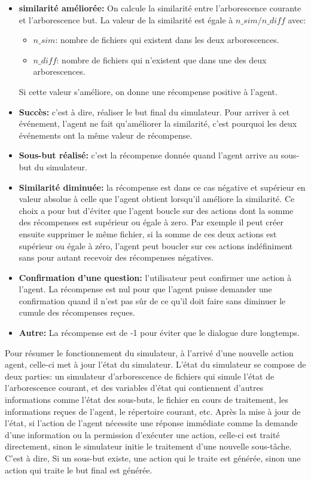 \begin{itemize}
	\item \textbf{similarité améliorée:} On calcule la similarité entre l'arborescence courante et l'arborescence but. La valeur de la similarité est égale à $n\_sim/n\_diff$ avec: 
	\begin{itemize}
		\item $n\_sim$: nombre de fichiers qui existent dans les deux arborescences.
		\item $n\_diff$: nombre de fichiers qui n'existent que dans une des deux arborescences.  
	\end{itemize}
	Si cette valeur s'améliore, on donne une récompense positive à l'agent.
	\item \textbf{Succès:} c'est à dire, réaliser le but final du simulateur. Pour arriver à cet événement, l'agent ne fait qu'améliorer la similarité, c'est pourquoi les deux événements ont la même valeur de récompense.
	\item \textbf{Sous-but réalisé:} c'est la récompense donnée quand l'agent arrive au sous-but du simulateur.
	\item \textbf{Similarité diminuée:} la récompense est dans ce cas négative et supérieur en valeur absolue à celle que l'agent obtient lorsqu'il améliore la similarité. Ce choix a pour but d'éviter que l'agent boucle sur des actions dont la somme des récompenses est supérieur ou égale à zero. Par exemple il peut créer ensuite supprimer le même fichier, si la somme de ces deux actions est supérieur ou égale à zéro, l'agent peut boucler sur ces actions indéfiniment sans pour autant recevoir des récompenses négatives.
	\item \textbf{Confirmation d'une question:} l'utilisateur peut confirmer une action à l'agent. La récompense est nul pour que l'agent puisse demander une confirmation quand il n'est pas sûr de ce qu'il doit faire sans diminuer le cumule des récompenses reçues.
	\item \textbf{Autre:} La récompense est de -1 pour éviter que le dialogue dure longtemps. 
\end{itemize}
Pour résumer le fonctionnement du simulateur, à l'arrivé d'une nouvelle action agent, celle-ci met à jour l'état du simulateur. L'état du simulateur se compose de deux parties: un simulateur d'arborescence de fichiers qui simule l'état de l'arborescence courant, et des variables d'état qui contiennent d'autres informations comme l'état des sous-buts, le fichier en cours de traitement, les informations reçues de l'agent, le répertoire courant, etc. Après la mise à jour de l'état, si l'action de l'agent nécessite une réponse immédiate comme la demande d'une information ou la permission d'exécuter une action, celle-ci est traité directement, sinon le simulateur initie le traitement d'une nouvelle sous-tâche. C'est à dire, Si un sous-but existe, une action qui le traite est générée, sinon une action qui traite le but final est générée.

